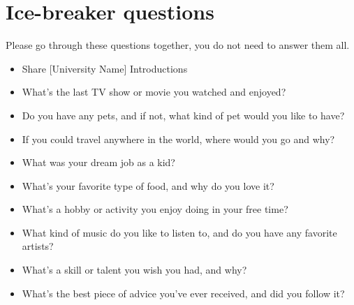 \appendix

\section{Ice-breaker questions}
\label{appendix:ice-breaker}
Please go through these questions together, you do not need to answer them all.
\begin{itemize}
    \item Share [University Name] Introductions 
    \item What's the last TV show or movie you watched and enjoyed?
    \item Do you have any pets, and if not, what kind of pet would you like to have?
    \item If you could travel anywhere in the world, where would you go and why?
    \item What was your dream job as a kid?
    \item What's your favorite type of food, and why do you love it?
    \item What's a hobby or activity you enjoy doing in your free time?
    \item What kind of music do you like to listen to, and do you have any favorite artists?
    \item What's a skill or talent you wish you had, and why?
    \item What's the best piece of advice you've ever received, and did you follow it?
\end{itemize}









